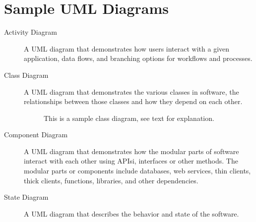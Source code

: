 %
% 
\section{Sample UML Diagrams}
\begin{description}
\item[Activity Diagram]  A UML diagram that demonstrates how users
interact with a given application, data flows, and branching options
for workflows and processes.

\item[Class Diagram] A UML diagram that demonstrates the various classes
in software, the relationships between those classes and how they depend
on each other.
\begin{figure}[h!]
\caption[Class Diagram Example]{
This is a sample class diagram, see text for explanation.}
\end{figure}

\item[Component Diagram] A UML diagram that demonstrates how the modular
parts of software interact with each other using APIsi, interfaces
or other methods. The modular parts or components include databases,
web services, thin clients, thick clients, functions, libraries, and
other dependencies.

\item[State Diagram] A UML diagram that describes the behavior and state
of the software.
\end{description}

%
%
